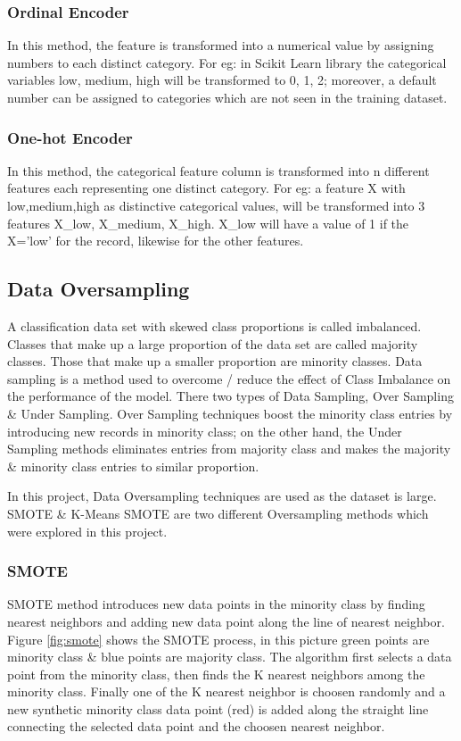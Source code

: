 \documentclass[twoside,11pt,a4paper]{article}
\begin{document}
\subsubsection{Ordinal Encoder}
In this method, the feature is transformed into a numerical value by assigning numbers to each distinct category. For eg: in Scikit Learn library the categorical variables low, medium, high will be transformed to 0, 1, 2; moreover, a default number can be assigned to categories which are not seen in the training dataset. 
\subsubsection{One-hot Encoder}
In this method, the categorical feature column is transformed into n different features each representing one distinct category. For eg: a feature X with low,medium,high as distinctive categorical values, will be transformed into 3 features X\_low, X\_medium, X\_high. X\_low will have a value of 1 if the X='low' for the record, likewise for the other features.
\subsection{Data Oversampling}
A classification data set with skewed class proportions is called imbalanced. Classes that make up a large proportion of the data set are called majority classes. Those that make up a smaller proportion are minority classes. Data sampling is a method used to overcome / reduce the effect of Class Imbalance on the performance of the model. There two types of Data Sampling, Over Sampling \& Under Sampling. Over Sampling techniques boost the minority class entries by introducing new records in minority class; on the other hand, the Under Sampling methods eliminates entries from majority class and makes the majority \& minority class entries to similar proportion.

In this project, Data Oversampling techniques are used as the dataset is large. \acf{SMOTE} \citep{chawla2002smote} \&  K-Means \acs{SMOTE} \citep{last2017oversampling} are two different Oversampling methods which were explored in this project.

\subsubsection{\acf{SMOTE}}
\acs{SMOTE} method introduces new data points in the minority class by finding nearest neighbors and adding new data point along the line of nearest neighbor. Figure \ref{fig:smote} shows the \acs{SMOTE} process, in this picture green points are minority class \&  blue points are majority class. The algorithm first selects a data point from the minority class, then finds the K nearest neighbors among the minority class. Finally one of the K nearest neighbor is choosen randomly and a new synthetic minority class data point (red) is added along the straight line connecting the selected data point and the choosen nearest neighbor.\\
\end{document}
